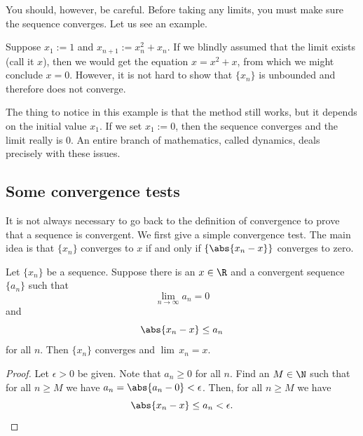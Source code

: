 \documentclass[12pt]{book}
\begin{document}
You should, however, be careful.
Before taking any limits, you must
make sure the sequence converges.
Let us see an example.

\begin{example}
Suppose $x_1 := 1$ and $x_{n+1} := x_n^2+x_n$.
If we blindly assumed that the limit exists (call it $x$), then we
would get the equation $x = x^2+x$, from which we might
conclude $x=0$.
However, it is not hard
to show that $\{ x_n \}$ is unbounded and therefore does not converge.

The thing to notice in this example is that the method still works, but
it depends on the initial value $x_1$.
If we set $x_1 := 0$,
then the sequence converges and the limit really is 0.
An entire branch of mathematics, called dynamics, deals precisely with these
issues.
\end{example}

\subsection*{Some convergence tests}

It is not always necessary to go back to the definition of convergence
to prove that a sequence is convergent.
We first give a simple convergence test.
The main idea is that 
$\{ x_n \}$ converges to $x$ if and only if 
$\{ \abs{ x_n - x } \}$ converges to zero.

\begin{prop} \label{convzero:prop}
Let $\{ x_n \}$ be a sequence. 
Suppose there is an $x \in \R$
and a convergent sequence $\{ a_n \}$
such that
\begin{equation*}
\lim_{n\to\infty} a_n = 0
\end{equation*}
and 
\begin{equation*}
\abs{x_n - x} \leq a_n
\end{equation*}
for all $n$.
Then $\{ x_n \}$ converges and $\lim\, x_n = x$.
\end{prop}

\begin{proof}
Let $\epsilon > 0$ be given.
Note that $a_n \geq 0$
for all $n$.
Find an $M \in \N$ such that for
all $n \geq M$ we have
$a_n = \abs{a_n - 0} < \epsilon$.
Then, for all $n \geq M$
we have
\begin{equation*}
\abs{x_n - x} \leq a_n < \epsilon . \qedhere
\end{equation*}
\end{proof}
\end{document}
